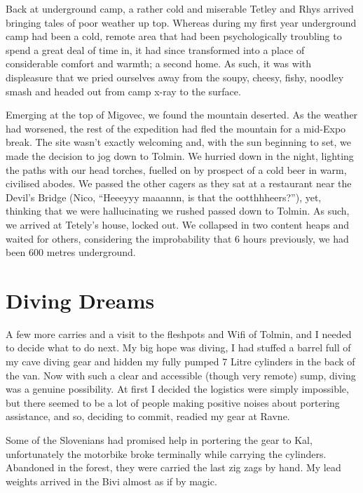 Back at underground camp, a rather cold and miserable Tetley and Rhys
arrived bringing tales of poor weather up top. Whereas during my first
year underground camp had been a cold, remote area that had been
psychologically troubling to spend a great deal of time in, it had since
transformed into a place of considerable comfort and warmth; a second
home. As such, it was with displeasure that we pried ourselves away from
the soupy, cheesy, fishy, noodley smash and headed out from camp x-ray
to the surface.

Emerging at the top of Migovec, we found the mountain deserted. As the
weather had worsened, the rest of the expedition had fled the mountain
for a mid-Expo break. The site wasn't exactly welcoming and, with the
sun beginning to set, we made the decision to jog down to Tolmin. We
hurried down in the night, lighting the paths with our head torches,
fuelled on by prospect of a cold beer in warm, civilised abodes. We
passed the other cagers as they sat at a restaurant near the Devil's
Bridge (Nico, ``Heeeyyy maaannn, is that the ootthhheers?''), yet,
thinking that we were hallucinating we rushed passed down to Tolmin. As
such, we arrived at Tetely's house, locked out. We collapsed in two
content heaps and waited for others, considering the improbability that
6 hours previously, we had been 600 metres underground.


\section{Diving Dreams}\label{diving-dreams}

A few more carries and a visit to the fleshpots and Wifi of Tolmin, and
I needed to decide what to do next. My big hope was diving, I had
stuffed a barrel full of my cave diving gear and hidden my fully pumped
7 Litre cylinders in the back of the van. Now with such a clear and
accessible (though very remote) sump, diving was a genuine possibility.
At first I decided the logistics were simply impossible, but there
seemed to be a lot of people making positive noises about portering
assistance, and so, deciding to commit, readied my gear at Ravne.

Some of the Slovenians had promised help in portering the gear to Kal,
unfortunately the motorbike broke terminally while carrying the
cylinders. Abandoned in the forest, they were carried the last zig zags
by hand. My lead weights arrived in the Bivi almost as if by magic.


